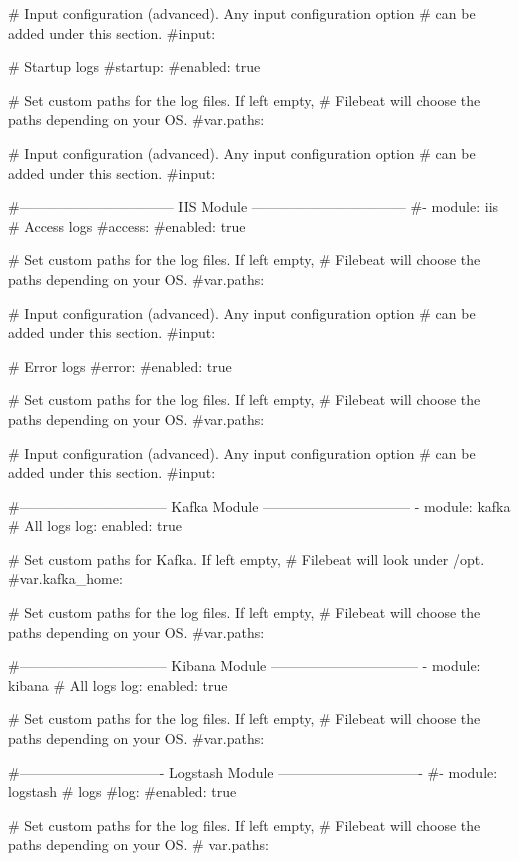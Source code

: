     # Input configuration (advanced). Any input configuration option
    # can be added under this section.
    #input:

  # Startup logs
  #startup:
    #enabled: true

    # Set custom paths for the log files. If left empty,
    # Filebeat will choose the paths depending on your OS.
    #var.paths:

    # Input configuration (advanced). Any input configuration option
    # can be added under this section.
    #input:

#--------------------------------- IIS Module ---------------------------------
#- module: iis
  # Access logs
  #access:
    #enabled: true

    # Set custom paths for the log files. If left empty,
    # Filebeat will choose the paths depending on your OS.
    #var.paths:

    # Input configuration (advanced). Any input configuration option
    # can be added under this section.
    #input:

  # Error logs
  #error:
    #enabled: true

    # Set custom paths for the log files. If left empty,
    # Filebeat will choose the paths depending on your OS.
    #var.paths:

    # Input configuration (advanced). Any input configuration option
    # can be added under this section.
    #input:

#-------------------------------- Kafka Module --------------------------------
- module: kafka
  # All logs
  log:
    enabled: true

    # Set custom paths for Kafka. If left empty,
    # Filebeat will look under /opt.
    #var.kafka_home:

    # Set custom paths for the log files. If left empty,
    # Filebeat will choose the paths depending on your OS.
    #var.paths:

#-------------------------------- Kibana Module --------------------------------
- module: kibana
  # All logs
  log:
    enabled: true

    # Set custom paths for the log files. If left empty,
    # Filebeat will choose the paths depending on your OS.
    #var.paths:

#------------------------------- Logstash Module -------------------------------
#- module: logstash
  # logs
  #log:
    #enabled: true

    # Set custom paths for the log files. If left empty,
    # Filebeat will choose the paths depending on your OS.
    # var.paths:

